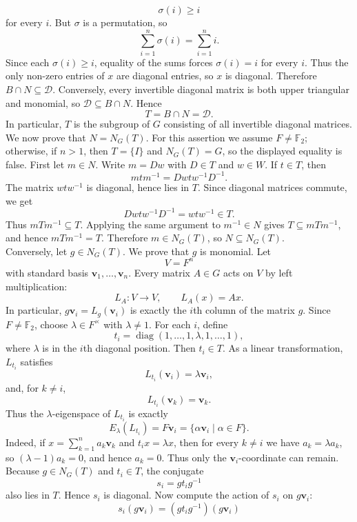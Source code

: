 \documentclass[../Odyssey_Project.tex]{subfiles}
\begin{document}
\begin{solution}
\[
    \sigma(i)\geq i
\]
for every $i$. But $\sigma$ is a permutation, so
\[
    \sum_{i=1}^n \sigma(i)=\sum_{i=1}^n i.
\]
Since each $\sigma(i)\geq i$, equality of the sums forces $\sigma(i)=i$ for every $i$. Thus the only non-zero entries of $x$ are diagonal entries, so $x$ is diagonal. Therefore $B\cap N\subseteq \mathcal D$. Conversely, every invertible diagonal matrix is both upper triangular and monomial, so $\mathcal D\subseteq B\cap N$. Hence
\[
    T=B\cap N=\mathcal D.
\]
In particular, $T$ is the subgroup of $G$ consisting of all invertible diagonal matrices.\\
We now prove that $N=N_G(T)$. For this assertion we assume $F\neq\mathbb F_2$; otherwise, if $n>1$, then $T=\{I\}$ and $N_G(T)=G$, so the displayed equality is false. First let $m\in N$. Write $m=Dw$ with $D\in T$ and $w\in W$. If $t\in T$, then
\[
    mtm^{-1}
    =
    Dw t w^{-1}D^{-1}.
\]
The matrix $w t w^{-1}$ is diagonal, hence lies in $T$. Since diagonal matrices commute, we get
\[
    Dw t w^{-1}D^{-1}=w t w^{-1}\in T.
\]
Thus $mTm^{-1}\subseteq T$. Applying the same argument to $m^{-1}\in N$ gives $T\subseteq mTm^{-1}$, and hence $mTm^{-1}=T$. Therefore $m\in N_G(T)$, so $N\subseteq N_G(T)$.\\
Conversely, let $g\in N_G(T)$. We prove that $g$ is monomial. Let
\[
    V=F^n
\]
with standard basis $\mathbf v_1,\ldots,\mathbf v_n$. Every matrix $A\in G$ acts on $V$ by left multiplication:
\[
    L_A\colon V\to V,\qquad L_A(x)=Ax.
\]
In particular, $g\mathbf v_i=L_g(\mathbf v_i)$ is exactly the $i$th column of the matrix $g$. Since $F\neq\mathbb F_2$, choose $\lambda\in F^\times$ with $\lambda\neq 1$. For each $i$, define
\[
    t_i=\operatorname{diag}(1,\ldots,1,\lambda,1,\ldots,1),
\]
where $\lambda$ is in the $i$th diagonal position. Then $t_i\in T$. As a linear transformation, $L_{t_i}$ satisfies
\[
    L_{t_i}(\mathbf v_i)=\lambda\mathbf v_i,
\]
and, for $k\neq i$,
\[
    L_{t_i}(\mathbf v_k)=\mathbf v_k.
\]
Thus the $\lambda$-eigenspace of $L_{t_i}$ is exactly
\[
    E_\lambda(L_{t_i})=F\mathbf v_i=\{\alpha\mathbf v_i\mid \alpha\in F\}.
\]
Indeed, if $x=\sum_{k=1}^n a_k\mathbf v_k$ and $t_i x=\lambda x$, then for every $k\neq i$ we have $a_k=\lambda a_k$, so $(\lambda-1)a_k=0$, and hence $a_k=0$. Thus only the $\mathbf v_i$-coordinate can remain.\\
Because $g\in N_G(T)$ and $t_i\in T$, the conjugate
\[
    s_i=gt_i g^{-1}
\]
also lies in $T$. Hence $s_i$ is diagonal. Now compute the action of $s_i$ on $g\mathbf v_i$:
\[
    s_i(g\mathbf v_i)
    =
    (gt_i g^{-1})(g\mathbf v_i)
\]
\end{solution}
\end{document}
